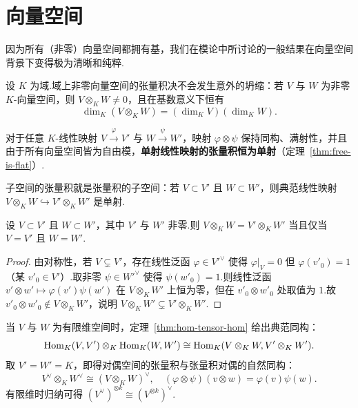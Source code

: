 \section{向量空间}
\label{sec:vector-spaces}

因为所有（非零）向量空间都拥有基，我们在模论中所讨论的一般结果在向量空间背景下变得极为清晰和纯粹.

设 $K$ 为域.域上非零向量空间的张量积决不会发生意外的坍缩：若 $V$ 与 $W$ 为非零 $K$-向量空间，则 $V \otimes_K W \neq 0$，且在基数意义下恒有
\[
  \dim_K(V \otimes_K W) = (\dim_K V)(\dim_K W).
\]

对于任意 $K$-线性映射 $V \xrightarrow{\varphi} V'$ 与 $W \xrightarrow{\psi} W'$，映射 $\varphi \otimes \psi$ 保持同构、满射性，并且由于所有向量空间皆为自由模，\textbf{单射线性映射的张量积恒为单射}（定理~\ref{thm:free-is-flat}）.

\begin{example}\label{ex:subspace-tensor}
子空间的张量积就是张量积的子空间：若 $V \subset V'$ 且 $W \subset W'$，则典范线性映射 $V \otimes_K W \hookrightarrow V' \otimes_K W'$ 是单射.
\end{example}

\begin{theorem}\label{thm:subspace-tensor-equality}
设 $V \subset V'$ 且 $W \subset W'$，其中 $V'$ 与 $W'$ 非零.则 $V \otimes_K W = V' \otimes_K W'$ 当且仅当 $V = V'$ 且 $W = W'$.
\end{theorem}

\begin{proof}
由对称性，若 $V \subsetneq V'$，存在线性泛函 $\varphi \in V'^\vee$ 使得 $\varphi|_V = 0$ 但 $\varphi(v'_0) = 1$（某 $v'_0 \in V'$）.取非零 $\psi \in W'^\vee$ 使得 $\psi(w'_0) = 1$.则线性泛函 $v' \otimes w' \mapsto \varphi(v')\psi(w')$ 在 $V \otimes_K W'$ 上恒为零，但在 $v'_0 \otimes w'_0$ 处取值为 $1$.故 $v'_0 \otimes w'_0 \notin V \otimes_K W'$，说明 $V \otimes_K W' \subsetneq V' \otimes_K W'$.
\end{proof}

当 $V$ 与 $W$ 为有限维空间时，定理~\ref{thm:hom-tensor-hom} 给出典范同构：
\[
  \operatorname{Hom}_K(V, V') \otimes_K \operatorname{Hom}_K(W, W') \cong \operatorname{Hom}_K(V \otimes_K W, V' \otimes_K W').
\]
取 $V' = W' = K$，即得对偶空间的张量积与张量积对偶的自然同构：
\begin{equation}
  V^\vee \otimes_K W^\vee \cong (V \otimes_K W)^\vee, \quad (\varphi \otimes \psi)(v \otimes w) = \varphi(v)\psi(w).
\end{equation}
有限维时归纳可得 $(V^\vee)^{\otimes k} \cong (V^{\otimes k})^\vee$.


